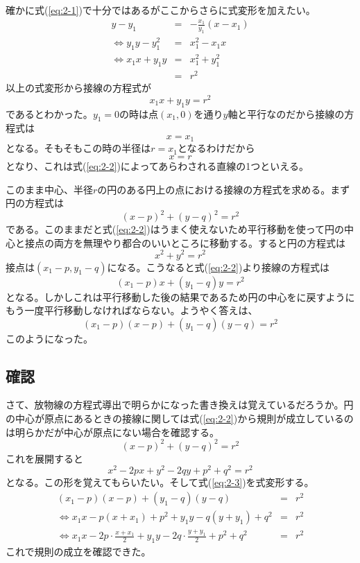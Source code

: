     確かに式(\ref{eq:2-1})で十分ではあるがここからさらに式変形を加えたい。
    \begin{eqnarray*}
        y-y_1 &=& -\frac{x_1}{y_1} (x-x_1)\\
        \Leftrightarrow y_1 y -y_1^2 &=& x_1^2 -x_1 x\\
        \Leftrightarrow x_1 x +y_1 y &=& x_1^2 +y_1^2\\
        &=& r^2
    \end{eqnarray*}
    以上の式変形から接線の方程式が
    \begin{equation}
        x_1 x +y_1 y= r^2
        \label{eq:2-2}
    \end{equation}
    であるとわかった。$y_1 = 0$の時は点$(x_1,0)$を通り$y$軸と平行なのだから接線の方程式は
    \[
    x=x_1
    \]
    となる。そもそもこの時の半径は$r=x_1$となるわけだから
    \[
    x=r
    \]
    となり、これは式(\ref{eq:2-2})によってあらわされる直線の1つといえる。

    このまま中心\ptt 、半径$r$の円のある円上の点\pt における接線の方程式を求める。まず円の方程式は
    \[
    (x-p)^2 +(y-q)^2=r^2
    \]
    である。このままだと式(\ref{eq:2-2})はうまく使えないため平行移動を使って円の中心と接点の両方を無理やり都合のいいところに移動する。すると円の方程式は
    \[
    x^2+y^2=r^2
    \]
    接点は$(x_1-p,y_1-q)$になる。こうなると式(\ref{eq:2-2})より接線の方程式は
    \[
    (x_1-p)x +(y_1-q)y=r^2
    \]
    となる。しかしこれは平行移動した後の結果であるため円の中心を\ptt に戻すようにもう一度平行移動しなければならない。ようやく答えは、
    \begin{equation}
        (x_1-p)(x-p) +(y_1-q)(y-q)=r^2
        \label{eq:2-3}
    \end{equation}
    このようになった。


    \subsection{確認}
    さて、放物線の方程式導出で明らかになった書き換えは覚えているだろうか。円の中心が原点にあるときの接線に関しては式(\ref{eq:2-2})から規則が成立しているのは明らかだが中心が原点にない場合を確認する。
    \[
    (x-p)^2 +(y-q)^2=r^2
    \]
    これを展開すると
    \[
    x^2-2px+y^2-2qy+p^2+q^2=r^2
    \]
    となる。この形を覚えてもらいたい。そして式(\ref{eq:2-3})を式変形する。
    \begin{eqnarray*}
        (x_1-p)(x-p) +(y_1-q)(y-q) &=& r^2\\
        \Leftrightarrow x_1 x -p(x +x_1) +p^2 +y_1 y -q(y+y_1) +q^2 &=& r^2\\
        \Leftrightarrow x_1 x -2p \cdot \frac{x +x_1}{2} +y_1 y -2q \cdot \frac{y+y_1}{2} +p^2 +q^2 &=& r^2
    \end{eqnarray*}
    これで規則の成立を確認できた。


%
